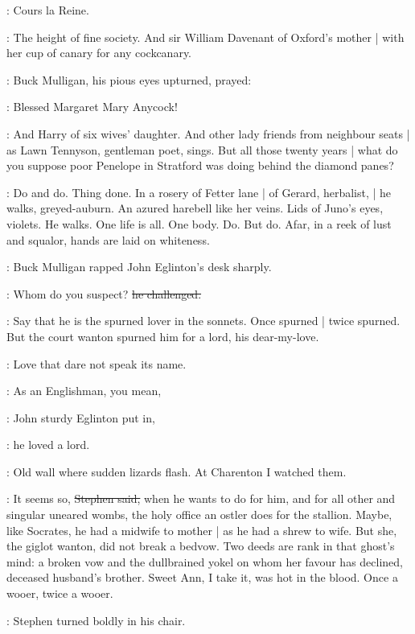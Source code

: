 \StephenInt:
Cours la Reine.

\Stephen:
The height of fine society.
And sir William Davenant of Oxford's mother |
with her cup of canary for any cockcanary.

:
Buck Mulligan,
his pious eyes upturned,
prayed:

\mulligan:
Blessed Margaret Mary Anycock!

\Stephen:
And Harry of six wives' daughter.
And other lady friends from neighbour seats |
as Lawn Tennyson, gentleman poet, sings.
But all those twenty years |
what do you suppose poor Penelope in Stratford was doing
behind the diamond panes?

\StephenInt:
Do and do.
Thing done.
In a rosery of Fetter lane |
of Gerard, herbalist, |
he walks, greyed-auburn.
An azured harebell like her veins.
Lids of Juno's eyes, violets.
He walks.
One life is all.
One body.
Do.
But do.
Afar,
in a reek of lust and squalor,
hands are laid on whiteness.

:
Buck Mulligan rapped John Eglinton's desk sharply.

\mulligan:
Whom do you suspect?
\sout{he challenged.}

\Stephen:
Say that he is the spurned lover in the sonnets.
Once spurned |
twice spurned.
But the court wanton spurned him for a lord,
his dear-my-love.

\StephenInt:
Love that dare not speak its name.

\eglinton:
As an Englishman,
you mean,

:
John sturdy Eglinton put in,

\eglinton:
he loved a lord.

\StephenInt:
Old wall where sudden lizards flash.
At Charenton I watched them.

\Stephen:
It seems so,
\sout{Stephen said,}
when he wants to do for him,
and for all other and singular uneared wombs,
the holy office an ostler does for the stallion.
Maybe,
like Socrates,
he had a midwife to mother |
as he had a shrew to wife.
But she,
the giglot wanton,
did not break a bedvow.
Two deeds are rank in that ghost's mind:
a broken vow and the dullbrained yokel on whom her favour has declined,
deceased husband's brother.
Sweet Ann,
I take it,
was hot in the blood.
Once a wooer,
twice a wooer.

:
Stephen turned boldly in his chair.

